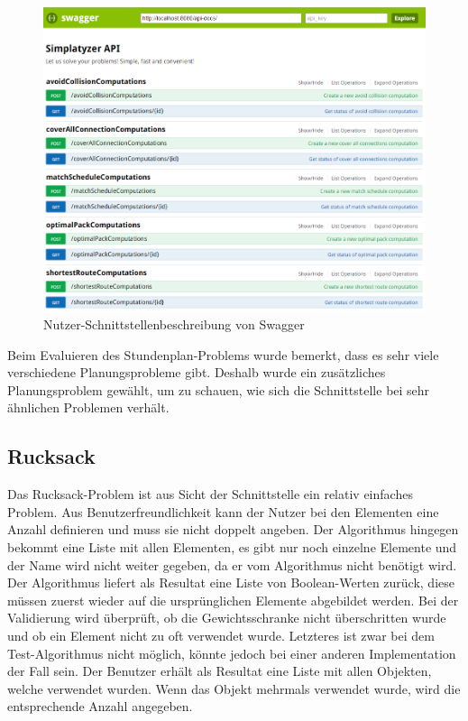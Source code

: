 \begin{figure}[h]
\centering
\includegraphics[scale=0.5]{images/swagger_api.png}
\caption[Nutzer-Schnittstellenbeschreibung von Swagger]{Nutzer-Schnittstellenbeschreibung von Swagger \selfmade{}}
\label{fig:swagger}
\end{figure}

\FloatBarrier

Beim Evaluieren des Stundenplan-Problems wurde bemerkt, dass es sehr viele verschiedene Planungsprobleme gibt. Deshalb wurde ein zusätzliches Planungsproblem gewählt, 
um zu schauen, wie sich die Schnittstelle bei sehr ähnlichen Problemen verhält.

%
%
%
%

\subsection{Rucksack}
Das Rucksack-Problem ist aus Sicht der Schnittstelle ein relativ einfaches Problem. Aus Benutzerfreundlichkeit kann der Nutzer bei den Elementen eine Anzahl definieren und muss sie nicht 
doppelt angeben. Der Algorithmus hingegen bekommt eine Liste mit allen Elementen, es gibt nur noch einzelne Elemente und der Name wird nicht weiter gegeben, da er vom Algorithmus nicht 
benötigt wird. Der Algorithmus liefert als Resultat eine Liste von Boolean-Werten zurück, diese müssen zuerst wieder auf die ursprünglichen Elemente abgebildet werden. Bei der Validierung wird 
überprüft, ob die Gewichtsschranke nicht überschritten wurde und ob ein Element nicht zu oft verwendet wurde. Letzteres ist zwar bei dem Test-Algorithmus nicht möglich, könnte jedoch bei 
einer anderen Implementation der Fall sein. Der Benutzer erhält als Resultat eine Liste mit allen Objekten, welche verwendet wurden. Wenn das Objekt mehrmals verwendet wurde, 
wird die entsprechende Anzahl angegeben.

